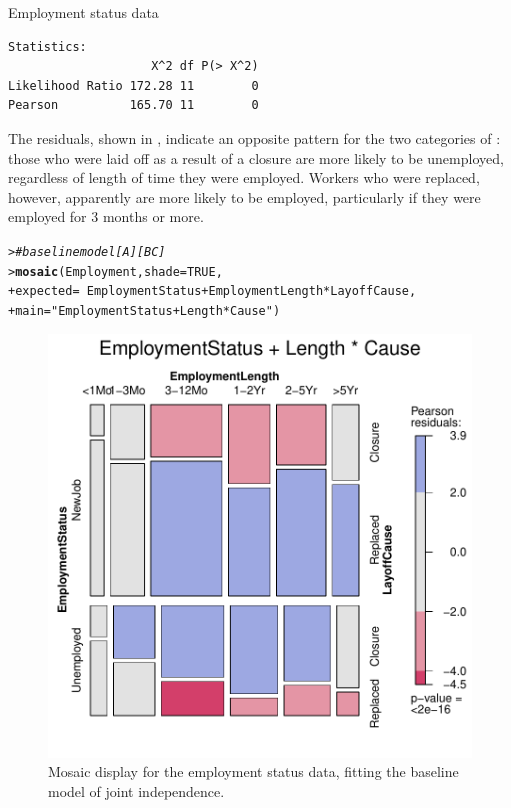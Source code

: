 \documentclass[10pt,krantz2]{krantz}\usepackage[]{graphicx}\usepackage[]{color}
\makeatletter
\newcommand{\hlnum}[1]{\textcolor[rgb]{0.686,0.059,0.569}{#1}}%
\newcommand{\hlstr}[1]{\textcolor[rgb]{0.192,0.494,0.8}{#1}}%
\newcommand{\hlcom}[1]{\textcolor[rgb]{0.678,0.584,0.686}{\textit{#1}}}%
\newcommand{\hlopt}[1]{\textcolor[rgb]{0,0,0}{#1}}%
\newcommand{\hlstd}[1]{\textcolor[rgb]{0.345,0.345,0.345}{#1}}%
\newcommand{\hlkwc}[1]{\textcolor[rgb]{0.333,0.667,0.333}{#1}}%
\newcommand{\hlkwd}[1]{\textcolor[rgb]{0.737,0.353,0.396}{\textbf{#1}}}%
\newenvironment{kframe}{%
 \def\at@end@of@kframe{}%
 \ifinner\ifhmode%
  \def\at@end@of@kframe{\end{minipage}}%
  \begin{minipage}{\columnwidth}%
 \fi\fi%
 \def\FrameCommand##1{\hskip\@totalleftmargin \hskip-\fboxsep
 \colorbox{shadecolor}{##1}\hskip-\fboxsep
     \hskip-\linewidth \hskip-\@totalleftmargin \hskip\columnwidth}%
 \MakeFramed {\advance\hsize-\width
   \@totalleftmargin\z@ \linewidth\hsize
   \@setminipage}}%
 {\par\unskip\endMakeFramed%
 \at@end@of@kframe}
\newenvironment{knitrout}{}{} %
\renewenvironment{knitrout}{\small\renewcommand{\baselinestretch}{.85}}{} %
\makeatother
\begin{document}
\begin{Example}[employ]{Employment status data}
\begin{knitrout}
\begin{kframe}
\begin{verbatim}
Statistics:
                    X^2 df P(> X^2)
Likelihood Ratio 172.28 11        0
Pearson          165.70 11        0
\end{verbatim}
\end{kframe}
\end{knitrout}

The residuals, shown in ,
indicate an opposite pattern for the two categories of :
those who were laid off as a result of a closure
are more likely to be unemployed, regardless of length of time
they were employed.
Workers who were replaced, however, apparently are more likely
to be employed, particularly if they were employed for 3 months or more.

\begin{knitrout}
\color{fgcolor}\begin{kframe}
\begin{alltt}
\hlstd{> }\hlcom{# baseline model [A][BC]}
\hlstd{> }\hlkwd{mosaic}\hlstd{(Employment,} \hlkwc{shade} \hlstd{=} \hlnum{TRUE}\hlstd{,}
\hlstd{+ }       \hlkwc{expected} \hlstd{=} \hlopt{~} \hlstd{EmploymentStatus} \hlopt{+} \hlstd{EmploymentLength} \hlopt{*} \hlstd{LayoffCause,}
\hlstd{+ }       \hlkwc{main} \hlstd{=} \hlstr{"EmploymentStatus + Length * Cause"}\hlstd{)}
\end{alltt}
\end{kframe}\begin{figure}[!htbp]

\centerline{\includegraphics[width=.6\textwidth]{ch05/fig/employ-mos1-1} }

\caption[Mosaic display for the employment status data, fitting the baseline model of joint independence]{Mosaic display for the employment status data, fitting the baseline model of joint independence.}\label{fig:employ-mos1}
\end{figure}



\end{knitrout}
\end{Example}
\end{document}
